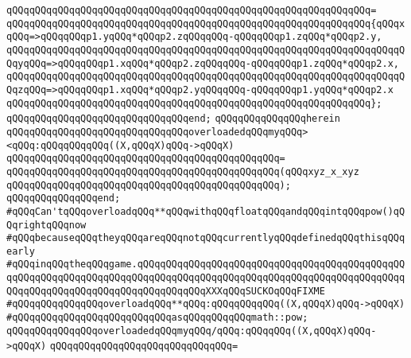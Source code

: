 \verb|qQQqqQQqqQQqqQQqqQQqqQQqqQQqqQQqqQQqqQQqqQQqqQQqqQQqqQQqqQQqqQQq=|\newline
\verb|qQQqqQQqqQQqqQQqqQQqqQQqqQQqqQQqqQQqqQQqqQQqqQQqqQQqqQQqqQQqqQQq{qQQqxqQQq=>qQQqqQQqp1.yqQQq*qQQqp2.zqQQqqQQq-qQQqqQQqp1.zqQQq*qQQqp2.y,|\newline
\verb|qQQqqQQqqQQqqQQqqQQqqQQqqQQqqQQqqQQqqQQqqQQqqQQqqQQqqQQqqQQqqQQqqQQqqQQqyqQQq=>qQQqqQQqp1.xqQQq*qQQqp2.zqQQqqQQq-qQQqqQQqp1.zqQQq*qQQqp2.x,|\newline
\verb|qQQqqQQqqQQqqQQqqQQqqQQqqQQqqQQqqQQqqQQqqQQqqQQqqQQqqQQqqQQqqQQqqQQqqQQqzqQQq=>qQQqqQQqp1.xqQQq*qQQqp2.yqQQqqQQq-qQQqqQQqp1.yqQQq*qQQqp2.x|\newline
\verb|qQQqqQQqqQQqqQQqqQQqqQQqqQQqqQQqqQQqqQQqqQQqqQQqqQQqqQQqqQQqqQQq};|\newline
\verb|qQQqqQQqqQQqqQQqqQQqqQQqqQQqqQQqend;|\newline
\verb|qQQqqQQqqQQqqQQqherein|\newline
\verb|qQQqqQQqqQQqqQQqqQQqqQQqqQQqqQQqoverloadedqQQqmyqQQq><qQQq:qQQqqQQqqQQq((X,qQQqX)qQQq->qQQqX)|\newline
\verb|qQQqqQQqqQQqqQQqqQQqqQQqqQQqqQQqqQQqqQQqqQQqqQQq=|\newline
\verb|qQQqqQQqqQQqqQQqqQQqqQQqqQQqqQQqqQQqqQQqqQQqqQQq(qQQqxyz_x_xyz|\newline
\verb|qQQqqQQqqQQqqQQqqQQqqQQqqQQqqQQqqQQqqQQqqQQqqQQq);|\newline
\verb|qQQqqQQqqQQqqQQqend;|\newline
\newline
\verb|#qQQqCan'tqQQqoverloadqQQq**qQQqwithqQQqfloatqQQqandqQQqintqQQqpow()qQQqrightqQQqnow|\newline
\verb|#qQQqbecauseqQQqtheyqQQqareqQQqnotqQQqcurrentlyqQQqdefinedqQQqthisqQQqearly|\newline
\verb|#qQQqinqQQqtheqQQqgame.qQQqqQQqqQQqqQQqqQQqqQQqqQQqqQQqqQQqqQQqqQQqqQQqqQQqqQQqqQQqqQQqqQQqqQQqqQQqqQQqqQQqqQQqqQQqqQQqqQQqqQQqqQQqqQQqqQQqqQQqqQQqqQQqqQQqqQQqqQQqqQQqqQQqqQQqXXXqQQqSUCKOqQQqFIXME|\newline
\verb|#qQQqqQQqqQQqqQQqoverloadqQQq**qQQq:qQQqqQQqqQQq((X,qQQqX)qQQq->qQQqX)|\newline
\verb|#qQQqqQQqqQQqqQQqqQQqqQQqqQQqasqQQqqQQqqQQqmath::pow;|\newline
\newline
\verb|qQQqqQQqqQQqqQQqoverloadedqQQqmyqQQq/qQQq:qQQqqQQq((X,qQQqX)qQQq->qQQqX)|\newline
\verb|qQQqqQQqqQQqqQQqqQQqqQQqqQQqqQQq=|\newline
